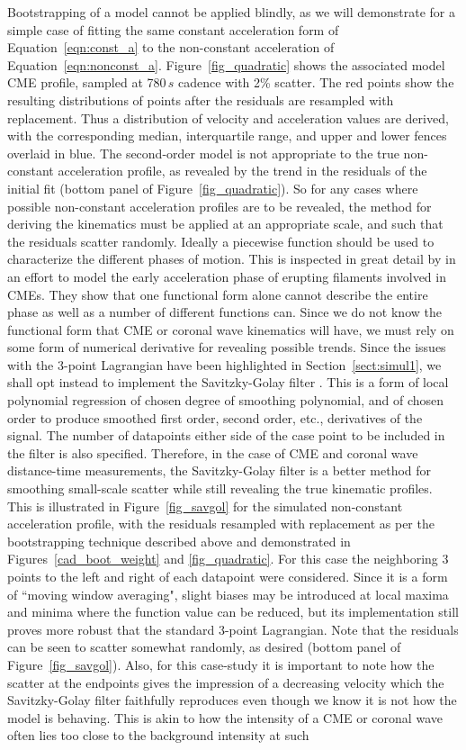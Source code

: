 \documentclass[structabstract]{aa}
\begin{document}
Bootstrapping of a model cannot be applied blindly, as we will demonstrate for a simple case of fitting the same constant acceleration form of Equation~\ref{eqn:const_a} to the non-constant acceleration of Equation~\ref{eqn:nonconst_a}. Figure~\ref{fig_quadratic} shows the associated model CME profile, sampled at 780$\,s$ cadence with 2\% scatter. The red points show the resulting distributions of points after the residuals are resampled with replacement. Thus a distribution of velocity and acceleration values are derived, with the corresponding median, interquartile range, and upper and lower fences overlaid in blue. The second-order model is not appropriate to the true non-constant acceleration profile, as revealed by the trend in the residuals of the initial fit (bottom panel of Figure~\ref{fig_quadratic}). So for any cases where possible non-constant acceleration profiles are to be revealed, the method for deriving the kinematics must be applied at an appropriate scale, and such that the residuals scatter randomly. Ideally a piecewise function should be used to characterize the different phases of motion. This is inspected in great detail by \citet{2008ApJ...674..586S} in an effort to model the early acceleration phase of erupting filaments involved in CMEs. They show that one functional form alone cannot describe the entire phase as well as a number of different functions can. Since we do not know the functional form that CME or coronal wave kinematics will have, we must rely on some form of numerical derivative for revealing possible trends. Since the issues with the 3-point Lagrangian have been highlighted in Section~\ref{sect:simul1}, we shall opt instead to implement the Savitzky-Golay filter \citep{Savitzky-Golay1964}. This is a form of local polynomial regression of chosen degree of smoothing polynomial, and of chosen order to produce smoothed first order, second order, etc., derivatives of the signal. The number of datapoints either side of the case point to be included in the filter is also specified. Therefore, in the case of CME and coronal wave distance-time measurements, the Savitzky-Golay filter is a better method for smoothing small-scale scatter while still revealing the true kinematic profiles. This is illustrated in Figure~\ref{fig_savgol} for the simulated non-constant acceleration profile, with the residuals resampled with replacement as per the bootstrapping technique described above and demonstrated in Figures~\ref{cad_boot_weight} and \ref{fig_quadratic}. For this case the neighboring 3 points to the left and right of each datapoint were considered. Since it is a form of ``moving window averaging", slight biases may be introduced at local maxima and minima where the function value can be reduced, but its implementation still proves more robust that the standard 3-point Lagrangian. Note that the residuals can be seen to scatter somewhat randomly, as desired (bottom panel of Figure~\ref{fig_savgol}). Also, for this case-study it is important to note how the scatter at the endpoints gives the impression of a decreasing velocity which the Savitzky-Golay filter faithfully reproduces even though we know it is not how the model is behaving. This is akin to how the intensity of a CME or coronal wave often lies too close to the background intensity at such 
\end{document}
